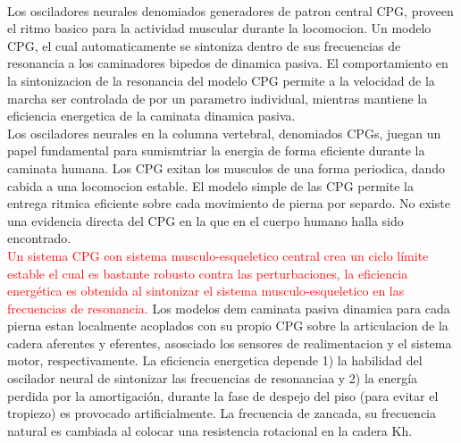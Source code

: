 \documentclass[10pt,onecolumn,twoside,letterpaper]{article}
\begin{document}
{%
}\cite{Wu2009}\\
Los osciladores neurales denomiados generadores de patron central CPG, proveen el ritmo basico para la actividad muscular durante la locomocion. Un modelo CPG, el cual automaticamente se sintoniza dentro de sus frecuencias de resonancia a los caminadores bipedos de dinamica pasiva. El comportamiento en la  sintonizacion de la resonancia del modelo CPG permite a la velocidad de la marcha ser controlada de por un parametro individual, mientras mantiene la eficiencia energetica de la caminata dinamica pasiva.\cite{Verdaasdonk2009}\\
Los osciladores neurales en la columna vertebral, denomiados CPGs, juegan un papel fundamental para sumismtriar la energia de forma eficiente durante la caminata humana. Los CPG exitan los musculos de una forma periodica, dando cabida a una locomocion estable. El modelo simple de las CPG permite la entrega ritmica eficiente sobre cada movimiento de pierna por separdo. No existe una evidencia directa del CPG en la que en el cuerpo humano halla sido encontrado.\cite{Verdaasdonk2009}\\
\textcolor{red}{Un sistema CPG con sistema musculo-esqueletico central crea un ciclo l\'imite estable el cual es bastante robusto contra las perturbaciones, la eficiencia energ\'etica es obtenida al sintonizar el sistema musculo-esqueletico en las frecuencias de resonancia.} Los modelos dem caminata pasiva dinamica para cada pierna estan localmente acoplados con su propio CPG sobre la articulacion de la cadera aferentes y eferentes, asosciado los sensores de realimentacion y el sistema motor, respectivamente. La eficiencia energetica depende 1) la habilidad del oscilador neural de sintonizar las frecuencias de resonanciaa y 2) la energ\'ia perdida por la amortigaci\'on, durante la fase de despejo del piso (para evitar el tropiezo) es provocado artificialmente. La frecuencia de zancada, su frecuencia natural es cambiada al colocar una resistencia rotacional en la cadera Kh.\cite{Verdaasdonk2009}\\
\end{document}
